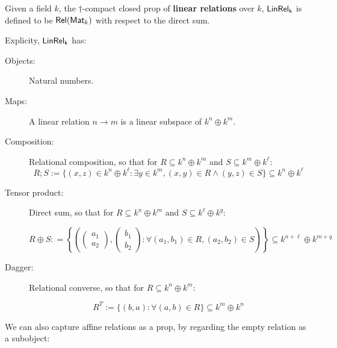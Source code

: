 \begin{definition}
Given a field $k$, the $\dag$-compact closed prop of {\bf linear relations} over $k$, $\sf LinRel_{k}$ is defined to be $\mathsf{Rel}(\mathsf{Mat}_k)$ with respect to the direct sum.

Explicity, $\sf LinRel_{k}$ has:

\begin{description}
\item[Objects:] Natural numbers.

\item[Maps:] A linear relation $n\to m$ is a linear subspace of $k^n \oplus k^m$.

\item[Composition:] Relational composition, so that for $R \subseteq k^n \oplus k^m$  and $S \subseteq k^m \oplus k^\ell$:
$$
R;S := \{  (x,z) \in k^{n} \oplus k^{\ell} : \exists y \in k^{m}, (x,y) \in R \wedge (y,z) \in S \} \subseteq k^n \oplus k^\ell
$$ 

\item[Tensor product:] Direct sum, so that for $R \subseteq k^n \oplus k^m$ and $S \subseteq k^\ell \oplus k^q$:

$$R\oplus S : =
\left\{
\left(
\begin{pmatrix}
a_1\\a_2
\end{pmatrix},
\begin{pmatrix}
b_1\\b_2
\end{pmatrix}
:
\forall (a_1,b_1) \in R, (a_2,b_2) \in S
\right)
\right\} \subseteq k^{n+\ell}\oplus k^{m+q}
$$

\item[Dagger:] Relational converse, so that for $R \subseteq k^{n}\oplus k^m$:

$$
R^T := \{ (b,a) : \forall (a,b) \in R \} \subseteq k^{m} \oplus k^n
$$
\end{description}
\end{definition}

We can also capture affine relations as a prop, by regarding the empty relation as a subobject:




